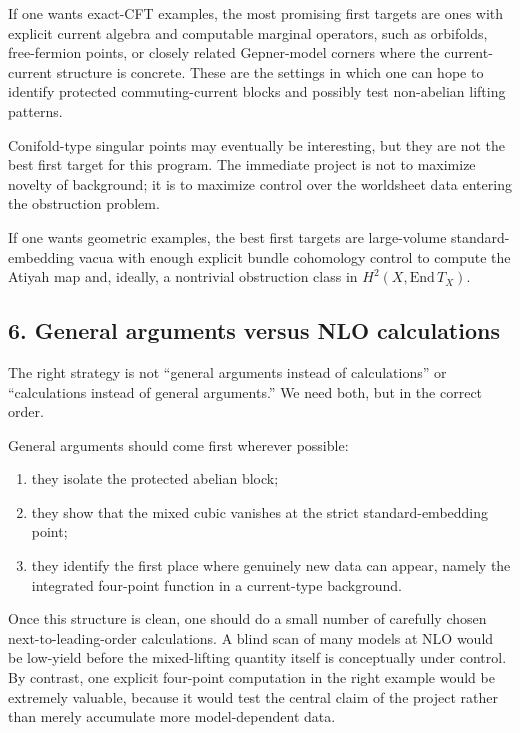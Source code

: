 \documentclass[11pt]{article}
\begin{document}
If one wants exact-CFT examples, the most promising first targets are ones with explicit current algebra and computable marginal operators, such as orbifolds, free-fermion points, or closely related Gepner-model corners where the current-current structure is concrete. These are the settings in which one can hope to identify protected commuting-current blocks and possibly test non-abelian lifting patterns.

Conifold-type singular points may eventually be interesting, but they are not the best first target for this program. The immediate project is not to maximize novelty of background; it is to maximize control over the worldsheet data entering the obstruction problem.

If one wants geometric examples, the best first targets are large-volume standard-embedding vacua with enough explicit bundle cohomology control to compute the Atiyah map and, ideally, a nontrivial obstruction class in $H^2(X,\mathrm{End}\,T_X)$.

\subsection*{6. General arguments versus NLO calculations}

The right strategy is not ``general arguments instead of calculations'' or ``calculations instead of general arguments.'' We need both, but in the correct order.

General arguments should come first wherever possible:
\begin{enumerate}
\item they isolate the protected abelian block;
\item they show that the mixed cubic vanishes at the strict standard-embedding point;
\item they identify the first place where genuinely new data can appear, namely the integrated four-point function in a current-type background.
\end{enumerate}

Once this structure is clean, one should do a small number of carefully chosen next-to-leading-order calculations. A blind scan of many models at NLO would be low-yield before the mixed-lifting quantity itself is conceptually under control. By contrast, one explicit four-point computation in the right example would be extremely valuable, because it would test the central claim of the project rather than merely accumulate more model-dependent data.
\end{document}
